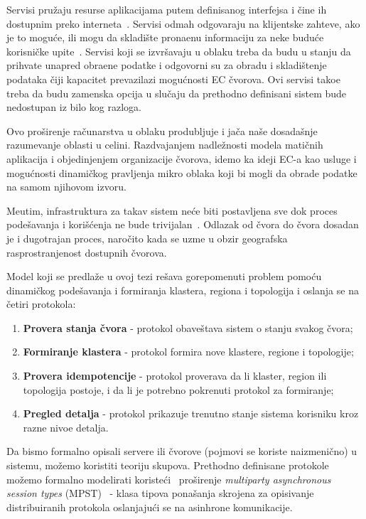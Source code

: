 Servisi pru\v zaju resurse aplikacijama putem definisanog interfejsa i \v cine ih dostupnim preko interneta~\cite {JinCJL14}. Servisi odmah odgovaraju na klijentske zahteve, ako je to mogu\'ce, ili mogu da skladi\v ste prona\dj enu informaciju za neke budu\'ce korisni\v cke upite~\cite {SatyanarayananBCD09, YaoXWYZP20}. Servisi koji se izvr\v savaju u oblaku treba da budu u stanju da prihvate unapred obra\dj ene podatke i odgovorni su za obradu i skladi\v stenje podataka \v ciji kapacitet prevazilazi mogu\'cnosti EC \v cvorova. Ovi servisi tako\dj e treba da budu zamenska opcija u slu\v caju da prethodno definisani sistem bude nedostupan iz bilo kog razloga.

Ovo pro\v sirenje ra\v cunarstva u oblaku produbljuje i ja\v ca na\v se dosada\v snje razumevanje oblasti u celini. Razdvajanjem nadle\v znosti modela mati\v cnih aplikacija i objedinjenjem organizacije \v cvorova, idemo ka ideji EC-a kao usluge i mogu\'cnosti dinami\v ckog pravljenja mikro oblaka koji bi mogli da obrade podatke na samom njihovom izvoru.

Me\dj utim, infrastruktura za takav sistem ne\'ce biti postavljena sve dok proces pode\v savanja i kori\v s\'cenja ne bude trivijalan~\cite{SatyanarayananBCD09}. Odlazak od \v cvora do \v cvora dosadan je i dugotrajan proces, naro\v cito kada se uzme u obzir geografska rasprostranjenost dostupnih \v cvorova. 

Model koji se predla\v ze u ovoj tezi re\v sava gorepomenuti problem pomo\'cu  dinami\v ckog pode\v savanja i formiranja klastera, regiona i topologija i oslanja se na \v cetiri protokola:

\begin{enumerate}[start=1,label={(\bfseries \arabic*)}]
	\item \textbf{Provera stanja \v cvora} - protokol obave\v stava sistem o stanju svakog \v cvora; 
	\item \textbf{Formiranje klastera} - protokol formira nove klastere, regione i topologije;
	\item \textbf{Provera idempotencije} - protokol proverava da li klaster, region ili topologija postoje, i da li je potrebno pokrenuti protokol za formiranje;
	\item \textbf{Pregled detalja} - protokol prikazuje trenutno stanje sistema korisniku kroz razne nivoe detalja.
\end{enumerate}

Da bismo formalno opisali servere ili \v cvorove (pojmovi se koriste naizmeni\v cno) u sistemu, mo\v zemo koristiti teoriju skupova. Prethodno definisane protokole mo\v zemo formalno modelirati koriste\'ci~\cite{HuY17} pro\v sirenje \emph{multiparty asynchronous session types} (MPST)~\cite {HondaYC08} - klasa tipova pona\v sanja skrojena za opisivanje distribuiranih protokola oslanjaju\'ci se na asinhrone komunikacije.

